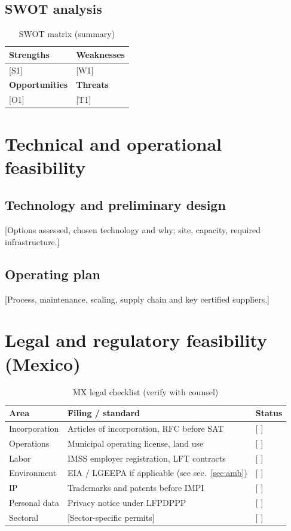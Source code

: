 \documentclass[12pt]{article}
\begin{document}
\subsection{SWOT analysis}
\begin{table}[h]
  \centering
  \caption{SWOT matrix (summary)}
  \begin{tabular}{p{}p{}}
    \toprule
    \textbf{Strengths} & \textbf{Weaknesses} \\
    \midrule
    {[S1]} & [W1] \\
    \bottomrule
    \textbf{Opportunities} & \textbf{Threats} \\
    \midrule
    {[O1]} & [T1] \\
    \bottomrule
  \end{tabular}
\end{table}

\section{Technical and operational feasibility}
\subsection{Technology and preliminary design}
[Options assessed, chosen technology and why; site, capacity, required
infrastructure.]
\subsection{Operating plan}
[Process, maintenance, scaling, supply chain and key certified suppliers.]

\section{Legal and regulatory feasibility (Mexico)}
\begin{table}[h]
  \centering
  \caption{MX legal checklist (verify with counsel)}
  \begin{tabular}{p{}p{}p{}}
    \toprule
    \textbf{Area} & \textbf{Filing / standard} & \textbf{Status} \\
    \midrule
    Incorporation & Articles of incorporation, RFC before SAT & [ ] \\
    Operations & Municipal operating license, land use & [ ] \\
    Labor & IMSS employer registration, LFT contracts & [ ] \\
    Environment & EIA / LGEEPA if applicable (see sec.~\ref{sec:amb}) & [ ] \\
    IP & Trademarks and patents before IMPI & [ ] \\
    Personal data & Privacy notice under LFPDPPP & [ ] \\
    Sectoral & [Sector-specific permits] & [ ] \\
    \bottomrule
  \end{tabular}
\end{table}
\end{document}
